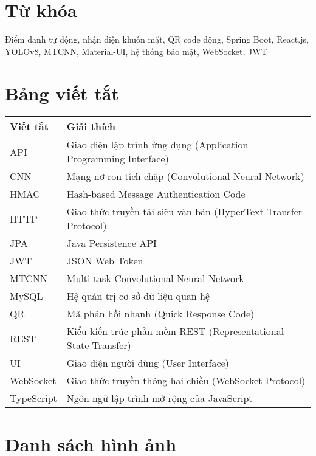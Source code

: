 \documentclass[12pt,a4paper]{report}
\begin{document}
\chapter*{Từ khóa}
Điểm danh tự động, nhận diện khuôn mặt, QR code động, Spring Boot, React.js, YOLOv8, MTCNN, Material-UI, hệ thống bảo mật, WebSocket, JWT

\chapter*{Bảng viết tắt}
\begin{longtable}{|l|p{10cm}|}
\hline
\textbf{Viết tắt} & \textbf{Giải thích} \\
\hline
API & Giao diện lập trình ứng dụng (Application Programming Interface) \\
CNN & Mạng nơ-ron tích chập (Convolutional Neural Network) \\
HMAC & Hash-based Message Authentication Code \\
HTTP & Giao thức truyền tải siêu văn bản (HyperText Transfer Protocol) \\
JPA & Java Persistence API \\
JWT & JSON Web Token \\
MTCNN & Multi-task Convolutional Neural Network \\
MySQL & Hệ quản trị cơ sở dữ liệu quan hệ \\
QR & Mã phản hồi nhanh (Quick Response Code) \\
REST & Kiểu kiến trúc phần mềm REST (Representational State Transfer) \\
UI & Giao diện người dùng (User Interface) \\
WebSocket & Giao thức truyền thông hai chiều (WebSocket Protocol) \\
TypeScript & Ngôn ngữ lập trình mở rộng của JavaScript \\
\hline
\end{longtable}

\chapter*{Danh sách hình ảnh}
\listoffigures

\end{document}

